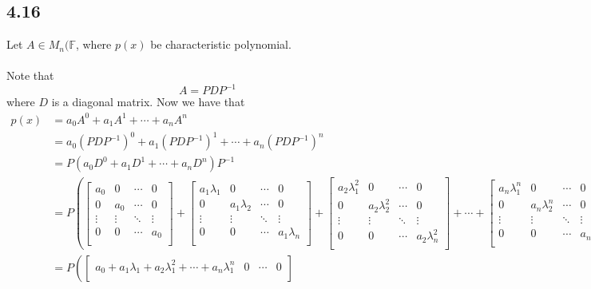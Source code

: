 \documentclass[letterpaper,12pt]{article}
\theoremstyle{definition}
\begin{document}
\subsection*{4.16}
Let $A \in M_n(\mathbb{F}$, where $p(x)$ be characteristic polynomial.\\\\
Note that
\[A = PDP^{-1}\]
where $D$ is a diagonal matrix. Now we have that 
{\tiny
\begin{align*}
p(x) &= a_0A^0 + a_1A^1 +\cdots +a_nA^n \\
&= a_0(PDP^{-1})^0 + a_1(PDP^{-1})^1 +\cdots +a_n(PDP^{-1})^n \\
&= P(a_0D^0 + a_1D^1 +\cdots +a_nD^n)P^{-1} \\
&= P \left(  
\begin{bmatrix}
a_0 & 0 & \cdots  &  0 \\
0 & a_0 & \cdots  &  0 \\
\vdots & \vdots & \ddots &  \vdots \\
0 & 0 & \cdots  &  a_0 \\
\end{bmatrix}
+
\begin{bmatrix}
a_1\lambda_1 & 0 & \cdots  &  0 \\
0 & a_1\lambda_2 & \cdots  &  0 \\
\vdots & \vdots & \ddots &  \vdots \\
0 & 0 & \cdots  &  a_1\lambda_n \\
\end{bmatrix}
+
\begin{bmatrix}
a_2\lambda_1^2 & 0 & \cdots  &  0 \\
0 & a_2\lambda_2^2 & \cdots  &  0 \\
\vdots & \vdots & \ddots &  \vdots \\
0 & 0 & \cdots  &  a_2\lambda_n^2 \\
\end{bmatrix}
+
\cdots
+
\begin{bmatrix}
a_n\lambda_1^n & 0 & \cdots  &  0 \\
0 & a_n\lambda_2^n & \cdots  &  0 \\
\vdots & \vdots & \ddots &  \vdots \\
0 & 0 & \cdots  &  a_n\lambda_n^n \\
\end{bmatrix}
\right)P^{-1} \\
&= 
P \left( 
\begin{bmatrix}
a_0 + a_1\lambda_1 + a_2 \lambda_1^2 + \cdots + a_n \lambda_1^n & 0 & \cdots & 0 \\

\end{bmatrix}
\end{align*}}
\end{document}
